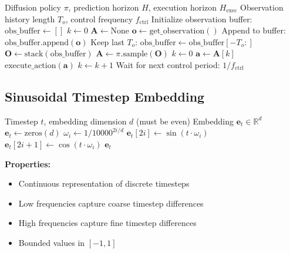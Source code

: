 \begin{algorithm}[H]
\caption{Receding Horizon Diffusion Policy Control}
\label{alg:receding_horizon_full}
\begin{algorithmic}[1]
\REQUIRE Diffusion policy $\pi$, prediction horizon $H$, execution horizon $H_{\text{exec}}$
\REQUIRE Observation history length $T_o$, control frequency $f_{\text{ctrl}}$
\STATE Initialize observation buffer: $\text{obs\_buffer} \gets []$
\STATE $k \gets 0$ 
\STATE $\mathbf{A} \gets \text{None}$ 
    \STATE $\mathbf{o} \gets \text{get\_observation}()$
    \STATE Append to buffer: $\text{obs\_buffer}.\text{append}(\mathbf{o})$
    \STATE Keep last $T_o$: $\text{obs\_buffer} \gets \text{obs\_buffer}[-T_o:]$
        \STATE $\mathbf{O} \gets \text{stack}(\text{obs\_buffer})$
        \STATE $\mathbf{A} \gets \pi.\text{sample}(\mathbf{O})$ 
        \STATE $k \gets 0$
    \ENDIF
    \STATE $\mathbf{a} \gets \mathbf{A}[k]$ 
    \STATE $\text{execute\_action}(\mathbf{a})$
    \STATE $k \gets k + 1$
    \STATE Wait for next control period: $1/f_{\text{ctrl}}$
\ENDWHILE
\end{algorithmic}
\end{algorithm}

\subsection{Sinusoidal Timestep Embedding}
\label{subsec:timestep_embedding_algorithm}

\begin{algorithm}[H]
\caption{Sinusoidal Timestep Embedding}
\label{alg:timestep_embedding}
\begin{algorithmic}[1]
\REQUIRE Timestep $t$, embedding dimension $d$ (must be even)
\ENSURE Embedding $\mathbf{e}_t \in \mathbb{R}^d$
\STATE $\mathbf{e}_t \gets \text{zeros}(d)$
    \STATE $\omega_i \gets 1 / 10000^{2i/d}$
    \STATE $\mathbf{e}_t[2i] \gets \sin(t \cdot \omega_i)$
    \STATE $\mathbf{e}_t[2i+1] \gets \cos(t \cdot \omega_i)$
\ENDFOR
\RETURN $\mathbf{e}_t$
\end{algorithmic}
\end{algorithm}

\textbf{Properties:}
\begin{itemize}
    \item Continuous representation of discrete timesteps
    \item Low frequencies capture coarse timestep differences
    \item High frequencies capture fine timestep differences
    \item Bounded values in $[-1, 1]$
\end{itemize}

